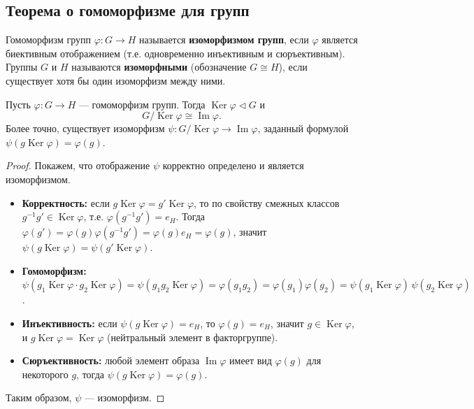 \documentclass[10pt]{article}
\begin{document}
\subsection{Теорема о гомоморфизме для групп}
\begin{definition}
Гомоморфизм групп $\varphi: G \to H$ называется \textbf{изоморфизмом групп}, если $\varphi$ является биективным отображением (т.е. одновременно инъективным и сюръективным). Группы $G$ и $H$ называются \textbf{изоморфными} (обозначение $G \cong H$), если существует хотя бы один изоморфизм между ними.
\end{definition}

\begin{theorem}
Пусть $\varphi: G \to H$ — гомоморфизм групп. Тогда $\operatorname{Ker}\varphi \triangleleft G$ и
$$G / \operatorname{Ker}\varphi \cong \operatorname{Im}\varphi.$$
Более точно, существует изоморфизм $\psi: G/\operatorname{Ker}\varphi \to \operatorname{Im}\varphi$, заданный формулой $\psi(g\operatorname{Ker}\varphi) = \varphi(g)$.
\end{theorem}
\begin{proof}
Покажем, что отображение $\psi$ корректно определено и является изоморфизмом.
\begin{itemize}
    \item \textbf{Корректность:} если $g\operatorname{Ker}\varphi = g'\operatorname{Ker}\varphi$, то по свойству смежных классов $g^{-1}g' \in \operatorname{Ker}\varphi$, т.е. $\varphi(g^{-1}g') = e_H$. Тогда $\varphi(g') = \varphi(g)\varphi(g^{-1}g') = \varphi(g)e_H = \varphi(g)$, значит $\psi(g\operatorname{Ker}\varphi) = \psi(g'\operatorname{Ker}\varphi)$.
    \item \textbf{Гомоморфизм:} $\psi(g_1\operatorname{Ker}\varphi \cdot g_2\operatorname{Ker}\varphi) = \psi(g_1g_2\operatorname{Ker}\varphi) = \varphi(g_1g_2) = \varphi(g_1)\varphi(g_2) = \psi(g_1\operatorname{Ker}\varphi)\,\psi(g_2\operatorname{Ker}\varphi)$.
    \item \textbf{Инъективность:} если $\psi(g\operatorname{Ker}\varphi) = e_H$, то $\varphi(g) = e_H$, значит $g \in \operatorname{Ker}\varphi$, и $g\operatorname{Ker}\varphi = \operatorname{Ker}\varphi$ (нейтральный элемент в факторгруппе).
    \item \textbf{Сюръективность:} любой элемент образа $\operatorname{Im}\varphi$ имеет вид $\varphi(g)$ для некоторого $g$, тогда $\psi(g\operatorname{Ker}\varphi) = \varphi(g)$.
\end{itemize}
Таким образом, $\psi$ — изоморфизм.
\end{proof}
\end{document}

